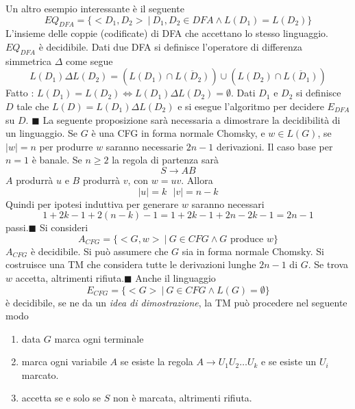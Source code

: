\documentclass[10pt, letterpaper]{report}
\begin{document}
Un altro esempio interessante è il seguente 
$$ EQ_{DFA}=\{<D_1,D_2>\ | \ D_1,D_2\in DFA\land L(D_1)=L(D_2)\}$$
L'insieme delle coppie (codificate) di DFA che accettano lo stesso linguaggio.\acc 
\prop{} $EQ_{DFA}$ è decidibile. \acc 
\dimo{} Dati due DFA si definisce l'operatore di  differenza simmetrica $\Delta$ come segue 
$$ L(D_1)\Delta L(D_2)= (L(D_1)\cap \overline{L(D_2)})\cup (L(D_2)\cap \overline{L(D_1)})$$
Fatto : $L(D_1)=L(D_2)\iff L(D_1)\Delta L(D_2)=\emptyset$. Dati $D_1$ e $D_2$ si definisce $D$ tale che 
$L(D)=L(D_1)\Delta L(D_2)$ e si esegue l'algoritmo per decidere $E_{DFA}$ su $D$. \hfill$\blacksquare$\acc 
La seguente proposizione sarà necessaria a dimostrare la decidibilità di un linguaggio. \acc 
\prop{} Se $G$ è una CFG in forma normale Chomsky, e $w\in L(G)$, se $|w|=n$ per produrre $w$ saranno necessarie $2n-1$ derivazioni. \acc 
\dimo{} Il caso base per $n=1$ è banale. Se $n\ge 2$ la regola di partenza sarà $$ S\rightarrow AB$$ 
$A$ produrrà $u$ e $B$ produrrà $v$, con $w=uv$. Allora 
$$ |u|= k \ \ \ |v|=n-k$$
Quindi per ipotesi induttiva per generare $w$ saranno necessari 
$$ 1+2k-1+2(n-k)-1=1+2k-1+2n-2k-1=2n-1$$
passi.\hfill$\blacksquare$\acc 
Si consideri 
$$ A_{CFG}=\{<G,w>\ |\ G\in CFG \land G \text{ produce }w\}$$
\prop{} $A_{CFG}$ è decidibile. \acc 
\dimo{} Si può assumere che $G$ sia in forma normale Chomsky. Si costruisce una TM che considera tutte le derivazioni lunghe $2n-1$ di $G$. Se trova $w$ accetta, altrimenti rifiuta.\hfill$\blacksquare$\acc 
Anche il linguaggio 
$$ E_{CFG}=\{<G>\ | \ G\in CFG \land L(G)=\emptyset\}$$
è decidibile, se ne da un \textit{idea di dimostrazione}, la TM può procedere nel seguente modo\begin{enumerate}
    \item data $G$ marca ogni terminale 
    \item marca ogni variabile $A$ se esiste la regola $A\longrightarrow U_1U_2\dots U_k$
    e se esiste un $U_i$ marcato. 
    \item accetta se e solo se $S$ non è marcata, altrimenti rifiuta.
\end{enumerate}
\flowerLine 
\end{document}
